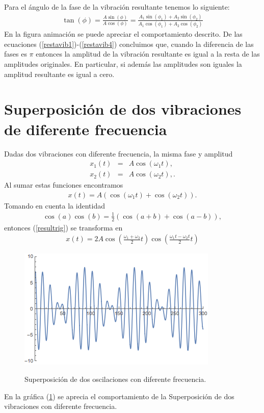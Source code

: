 \documentclass[letterpaper,12pt,oneside]{book}
\begin{document}
%
Para el \'angulo de la fase de la vibraci\'on resultante tenemos lo siguiente:
%
\begin{eqnarray}
\tan(\phi)=\frac{A\sin(\phi)}{A\cos(\phi)}=\frac{A_1\sin(\phi_1)+A_2\sin(\phi_2)}{A_1\cos(\phi_1)+A_2\cos(\phi_2)}\nonumber
\end{eqnarray}
%
%
En la figura animaci\'on se puede apreciar el comportamiento descrito.
%
De las ecuaciones (\ref{restavib1})-(\ref{restavib4}) concluimos que, cuando la diferencia de las fases es $\pi$ entonces la amplitud de la vibraci\'on resultante es igual a la resta de las amplitudes originales. En particular, si además las amplitudes son iguales la amplitud resultante es igual a cero. 
\section{Superposici\'on de dos vibraciones de diferente frecuencia}
%
Dadas dos vibraciones con diferente frecuencia, la misma fase  y amplitud
%
\begin{eqnarray}
x_1(t)&=& A\cos(\omega_1 t),\nonumber\\
x_2(t)&=&A\cos(\omega_2 t),\nonumber.
\end{eqnarray}
%
Al sumar estas funciones encontramos 
%
\begin{eqnarray}
x(t)=A\left(  \cos(\omega_1 t)+\cos(\omega_2 t)\right).
\label{resultrig}
\end{eqnarray}
%
Tomando en cuenta la identidad 
%
\begin{eqnarray}
\cos(a) \cos(b)=\frac{1}{2} \left( \cos(a+b)+ \cos(a-b)\right),
\end{eqnarray}
%
entonces (\ref{resultrig}) se transforma en
%
\begin{eqnarray}
x(t)= 2A\cos \left( \frac{\omega_1  +\omega_2}{2} t \right) \cos\left( \frac{\omega_1 t-\omega_2 t}{2} t \right) \nonumber
\end{eqnarray}
% 
\begin{figure}
\centering
\includegraphics[scale=0.8]{fig/2diferentefrecuencia}
\label{fig:dosdiferentefrecuencia}
\caption{Superposici\'on de dos oscilaciones con diferente frecuencia.  }
\end{figure}
%
En la gr\'afica (\ref{fig:dosdiferentefrecuencia}) se aprecia el comportamiento de la Superposici\'on de dos vibraciones con diferente frecuencia.
\end{document}
